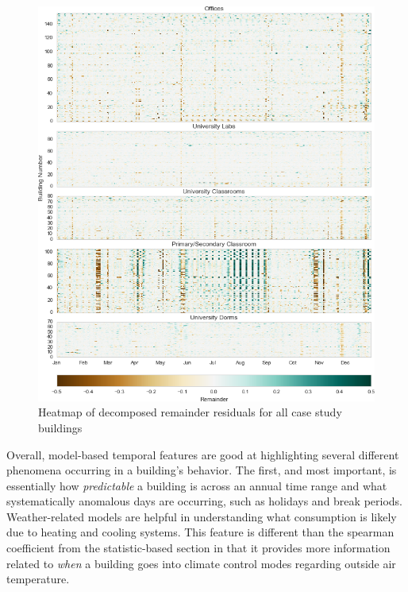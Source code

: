 \begin{figure}[ht!]
\begin{center}
\includegraphics[width=1\columnwidth]{figures/stl_weathernorm_remainder_heatmap/stl_weathernorm_remainder_heatmap}
\caption{Heatmap of decomposed remainder residuals for all case study buildings
\label{fig:residuals_heatmap}%
}
\end{center}
\end{figure}

Overall, model-based temporal features are good at highlighting several different phenomena occurring in a building's behavior. The first, and most important, is essentially how \emph{predictable} a building is across an annual time range and what systematically anomalous days are occurring, such as holidays and break periods. Weather-related models are helpful in understanding what consumption is likely due to heating and cooling systems. This feature is different than the spearman coefficient from the statistic-based section in that it provides more information related to \emph{when} a building goes into climate control modes regarding outside air temperature.